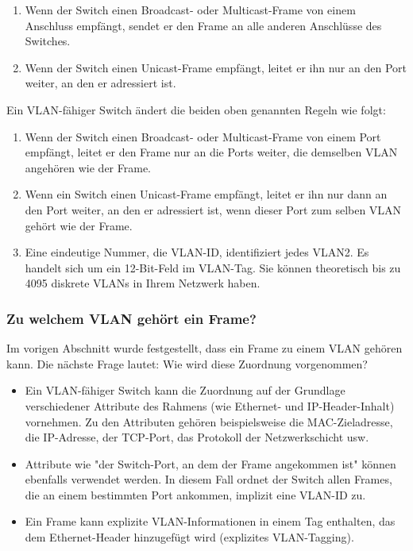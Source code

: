         \begin{enumerate}
            \item Wenn der Switch einen Broadcast- oder Multicast-Frame von einem Anschluss empfängt, sendet er den Frame an alle anderen Anschlüsse des Switches.
            \item Wenn der Switch einen Unicast-Frame empfängt, leitet er ihn nur an den Port weiter, an den er adressiert ist.
        \end{enumerate}

        Ein VLAN-fähiger Switch ändert die beiden oben genannten Regeln wie folgt:

        \begin{enumerate}
            \item Wenn der Switch einen Broadcast- oder Multicast-Frame von einem Port empfängt, leitet er den Frame nur an die Ports weiter, die demselben VLAN angehören wie der Frame.
            \item Wenn ein Switch einen Unicast-Frame empfängt, leitet er ihn nur dann an den Port weiter, an den er adressiert ist, wenn dieser Port zum selben VLAN gehört wie der Frame.
            \item Eine eindeutige Nummer, die VLAN-ID, identifiziert jedes VLAN2. Es handelt sich um ein 12-Bit-Feld im VLAN-Tag. Sie können theoretisch bis zu 4095 diskrete VLANs in Ihrem Netzwerk haben.
        \end{enumerate}

        \subsubsection{Zu welchem VLAN gehört ein Frame?}

        Im vorigen Abschnitt wurde festgestellt, dass ein Frame zu einem VLAN gehören kann. Die nächste Frage lautet: Wie wird diese Zuordnung vorgenommen?

        \begin{itemize}
            \item Ein VLAN-fähiger Switch kann die Zuordnung auf der Grundlage verschiedener Attribute des Rahmens (wie Ethernet- und IP-Header-Inhalt) vornehmen. Zu den Attributen gehören beispielsweise die MAC-Zieladresse, die IP-Adresse, der TCP-Port, das Protokoll der Netzwerkschicht usw.
            \item Attribute wie "der Switch-Port, an dem der Frame angekommen ist" können ebenfalls verwendet werden. In diesem Fall ordnet der Switch allen Frames, die an einem bestimmten Port ankommen, implizit eine VLAN-ID zu.
            \item Ein Frame kann explizite VLAN-Informationen in einem Tag enthalten, das dem Ethernet-Header hinzugefügt wird (explizites VLAN-Tagging).
        \end{itemize}

